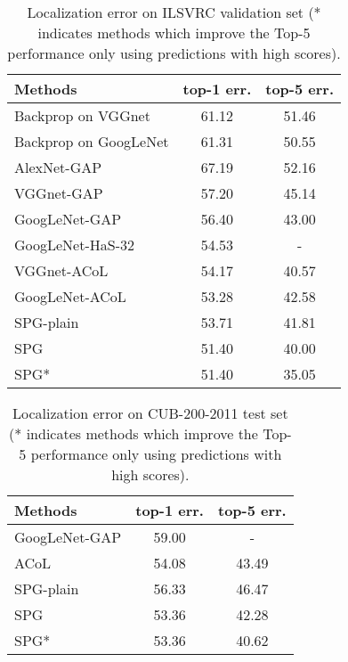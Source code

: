 \documentclass[runningheads]{llncs}
\begin{document}
\begin{table}[t]\setlength{\tabcolsep}{10pt}
  \centering
\caption{Localization error on ILSVRC validation set (* indicates methods which improve the Top-5 performance only using predictions with high scores).}\label{tab3}
  \begin{tabular}{l|c|c}
    \hline
    \hline
Methods & top-1 err. & top-5 err. \\
    \hline
     Backprop on VGGnet \cite{simonyan2013deep} & 61.12 & 51.46 \\
     Backprop on GoogLeNet \cite{simonyan2013deep} & 61.31 & 50.55 \\
     AlexNet-GAP \cite{zhou2015cnnlocalization} & 67.19 & 52.16 \\
     VGGnet-GAP \cite{zhou2015cnnlocalization} & 57.20 & 45.14 \\
     GoogLeNet-GAP \cite{zhou2015cnnlocalization} & 56.40 & 43.00 \\
     GoogLeNet-HaS-32 \cite{singh2017hide} & 54.53 & - \\
     VGGnet-ACoL \cite{zhang2018adversarial} & 54.17 & 40.57 \\
     GoogLeNet-ACoL \cite{zhang2018adversarial} & 53.28 & 42.58 \\
    \hline
     SPG-plain & 53.71 & 41.81 \\
     SPG & 51.40 & 40.00 \\
     SPG* & 51.40 & 35.05 \\
    \hline
    \hline
  \end{tabular}
\end{table}

\begin{table}\setlength{\tabcolsep}{14pt}
  \centering
\caption{Localization error on CUB-200-2011 test set (* indicates methods which improve the Top-5 performance only using predictions with high scores).}\label{tab4}
  \begin{tabular}{l|c|c}
    \hline
    \hline
    Methods & top-1 err. & top-5 err. \\
    \hline
    GoogLeNet-GAP \cite{zhou2015cnnlocalization} & 59.00 & - \\
    ACoL \cite{zhang2018adversarial} & 54.08 & 43.49 \\
    \hline
    SPG-plain & 56.33 & 46.47 \\
    SPG & 53.36 & 42.28 \\
    SPG* & 53.36 & 40.62  \\
    \hline
    \hline
  \end{tabular}
\end{table}
\end{document}
